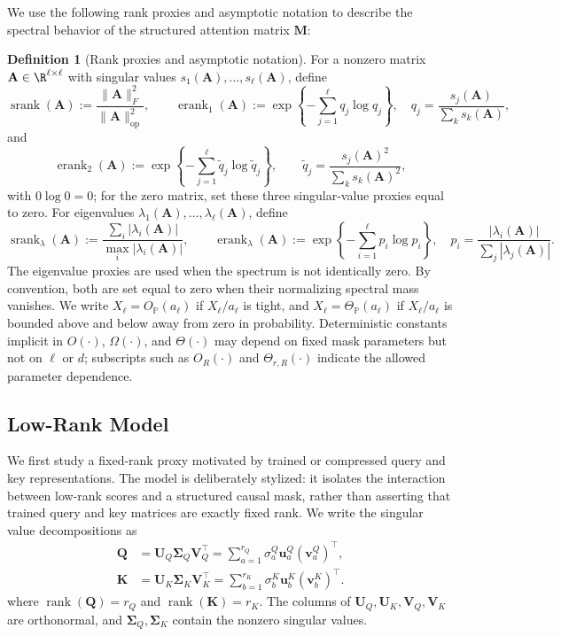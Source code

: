 \documentclass{article}
\newcommand{\Prob}{\mathbb{P}}
\newcommand{\rank}{\operatorname{rank}}
\newcommand{\srank}{\operatorname{srank}}
\newcommand{\erank}{\operatorname{erank}}
\newcommand{\op}{\operatorname{op}}
\newcommand{\bA}{\mathbf{A}}
\newcommand{\bM}{\mathbf{M}}
\newcommand{\bQ}{\mathbf{Q}}
\newcommand{\bK}{\mathbf{K}}
\newcommand{\bU}{\mathbf{U}}
\newcommand{\bV}{\mathbf{V}}
\newcommand{\bu}{\mathbf{u}}
\newcommand{\bv}{\mathbf{v}}
\newcommand{\bSigma}{\boldsymbol{\Sigma}}
\theoremstyle{definition}
\newtheorem{definition}[theorem]{Definition}
\theoremstyle{remark}
\begin{document}
We use the following rank proxies and asymptotic notation to describe the
spectral behavior of the structured attention matrix $\bM$:
\begin{definition}[Rank proxies and asymptotic notation]
For a nonzero matrix $\bA\in\R^{\ell\times\ell}$ with singular values
$s_1(\bA),\ldots,s_\ell(\bA)$, define
\[
    \srank(\bA)
    :=
    \frac{\|\bA\|_F^2}{\|\bA\|_{\op}^2},
    \qquad
    \erank_1(\bA)
    :=
    \exp\left\{-\sum_{j=1}^{\ell}q_j\log q_j\right\},
    \quad
    q_j=\frac{s_j(\bA)}{\sum_k s_k(\bA)},
\]
and
\[
    \erank_2(\bA)
    :=
    \exp\left\{-\sum_{j=1}^{\ell}\widetilde q_j\log\widetilde q_j\right\},
    \qquad
    \widetilde q_j=\frac{s_j(\bA)^2}{\sum_k s_k(\bA)^2},
\]
with $0\log0=0$; for the zero matrix, set these three singular-value proxies
equal to zero.  For eigenvalues
$\lambda_1(\bA),\ldots,\lambda_\ell(\bA)$, define
\[
    \srank_\lambda(\bA)
    :=
    \frac{\sum_i|\lambda_i(\bA)|}{\max_i|\lambda_i(\bA)|},
    \qquad
    \erank_\lambda(\bA)
    :=
    \exp\left\{-\sum_{i=1}^{\ell}p_i\log p_i\right\},
    \quad
    p_i=\frac{|\lambda_i(\bA)|}{\sum_j|\lambda_j(\bA)|}.
\]
The eigenvalue proxies are used when the spectrum is not identically zero.  By
convention, both are set equal to zero when their normalizing spectral mass
vanishes.
We write $X_\ell=O_{\Prob}(a_\ell)$ if $X_\ell/a_\ell$ is tight, and
$X_\ell=\Theta_{\Prob}(a_\ell)$ if $X_\ell/a_\ell$ is bounded above and below
away from zero in probability.  Deterministic constants implicit in
$O(\cdot)$, $\Omega(\cdot)$, and $\Theta(\cdot)$ may depend on fixed mask
parameters but not on $\ell$ or $d$; subscripts such as $O_R(\cdot)$ and
$\Theta_{r,R}(\cdot)$ indicate the allowed parameter dependence.
\label{def:rank-proxies}
\end{definition}

\subsection{Low-Rank Model}

We first study a fixed-rank proxy motivated by trained or compressed query and
key representations.  The model is deliberately stylized: it isolates the
interaction between low-rank scores and a structured causal mask, rather than
asserting that trained query and key matrices are exactly fixed rank.
We write the singular value decompositions as
\begin{equation}
    \begin{aligned}
    \bQ&=\bU_Q\bSigma_Q\bV_Q^\top
        =\sum_{a=1}^{r_Q}\sigma^Q_a\bu^Q_a(\bv^Q_a)^\top,\\
    \bK&=\bU_K\bSigma_K\bV_K^\top
        =\sum_{b=1}^{r_K}\sigma^K_b\bu^K_b(\bv^K_b)^\top.
    \end{aligned}
    \label{eq:svd}
\end{equation}
where $\rank(\bQ)=r_Q$ and $\rank(\bK)=r_K$.  The columns of
$\bU_Q,\bU_K,\bV_Q,\bV_K$ are orthonormal, and
$\bSigma_Q,\bSigma_K$ contain the nonzero singular values.
\end{document}
